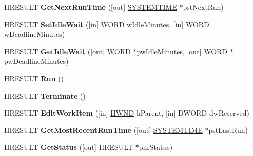 \begin{DoxyCompactItemize}
\item 
\mbox{\label{interface_i_scheduled_work_item_a85b8baf85d590421605a61a62d4bc1de}} 
H\+R\+E\+S\+U\+LT {\bfseries Get\+Next\+Run\+Time} (\mbox{[}out\mbox{]} \hyperlink{struct___s_y_s_t_e_m_t_i_m_e}{S\+Y\+S\+T\+E\+M\+T\+I\+ME} $\ast$pst\+Next\+Run)
\item 
\mbox{\label{interface_i_scheduled_work_item_ad8f16822a9f9d0594be28609726b3d20}} 
H\+R\+E\+S\+U\+LT {\bfseries Set\+Idle\+Wait} (\mbox{[}in\mbox{]} W\+O\+RD w\+Idle\+Minutes, \mbox{[}in\mbox{]} W\+O\+RD w\+Deadline\+Minutes)
\item 
\mbox{\label{interface_i_scheduled_work_item_a2034d18d744e35f30c5dc52e77e299b6}} 
H\+R\+E\+S\+U\+LT {\bfseries Get\+Idle\+Wait} (\mbox{[}out\mbox{]} W\+O\+RD $\ast$pw\+Idle\+Minutes, \mbox{[}out\mbox{]} W\+O\+RD $\ast$pw\+Deadline\+Minutes)
\item 
\mbox{\label{interface_i_scheduled_work_item_a6182b863e69d7bd3c9324ca3aec41451}} 
H\+R\+E\+S\+U\+LT {\bfseries Run} ()
\item 
\mbox{\label{interface_i_scheduled_work_item_a8218c6af92bd08b18b725624ade3f49c}} 
H\+R\+E\+S\+U\+LT {\bfseries Terminate} ()
\item 
\mbox{\label{interface_i_scheduled_work_item_a408f7e589b3f419b7665fafb166a153f}} 
H\+R\+E\+S\+U\+LT {\bfseries Edit\+Work\+Item} (\mbox{[}in\mbox{]} \hyperlink{interfacevoid}{H\+W\+ND} h\+Parent, \mbox{[}in\mbox{]} D\+W\+O\+RD dw\+Reserved)
\item 
\mbox{\label{interface_i_scheduled_work_item_a1032bf635e03d7a4e56662e39328f8c0}} 
H\+R\+E\+S\+U\+LT {\bfseries Get\+Most\+Recent\+Run\+Time} (\mbox{[}out\mbox{]} \hyperlink{struct___s_y_s_t_e_m_t_i_m_e}{S\+Y\+S\+T\+E\+M\+T\+I\+ME} $\ast$pst\+Last\+Run)
\item 
\mbox{\label{interface_i_scheduled_work_item_a698b63b434af5a8fad304c5173dc56de}} 
H\+R\+E\+S\+U\+LT {\bfseries Get\+Status} (\mbox{[}out\mbox{]} H\+R\+E\+S\+U\+LT $\ast$phr\+Status)

\end{DoxyCompactItemize}
